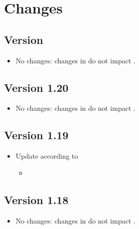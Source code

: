 \section{Changes}

\subsection*{Version \version}
\begin{itemize}
  \item No changes: changes in  do not impact \eacsl.
\end{itemize}

\subsection*{Version 1.20}
\begin{itemize}
  \item No changes: changes in  do not impact \eacsl.
\end{itemize}

\subsection*{Version 1.19}
\begin{itemize}
  \item Update according to 
    \begin{itemize}
    \item {}
    \end{itemize}
\end{itemize}

\subsection*{Version 1.18}
\begin{itemize}
  \item No changes: changes in  do not impact \eacsl.
\end{itemize}

